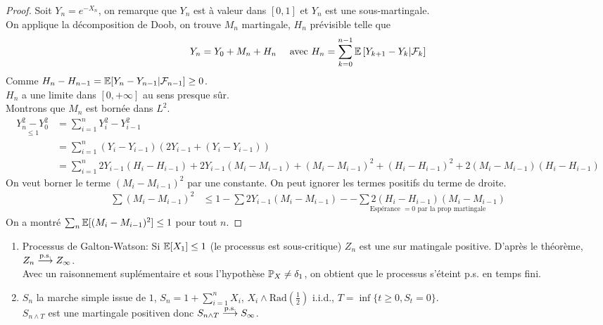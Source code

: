\documentclass[]{report}
\begin{document}
    \begin{proof}
        Soit $Y_n=e^{-X_n}$, on remarque que $Y_n$ est à valeur dans $[0,1]$ et $Y_n$ est une sous-martingale.\\
        On applique la décomposition de Doob, on trouve $M_n$ martingale, $H_n$ prévisible telle que
        \[Y_n=Y_0+M_n+H_n\quad \text{ avec }H_n=\sum_{k=0}^{n-1} \mathbb{E}\left[ Y_{k+1}- Y_k | \mathcal{F}_k\right]\]
        Comme $H_{n}-H_{n-1}=\mathbb{E}[Y_n-Y_{n-1}|\mathcal{F}_{n-1}]\ge 0$.\\
        $H_n$ a une limite dans $[0,+\infty]$ au sens presque sûr.\\
        Montrons que $M_n$ est bornée dans $L^2$.
        \begin{align*}
            \underset{\le 1}{Y_n^2-Y_0^2}&=\sum_{i=1}^{n}Y_i^2-Y_{i-1}^2\\
            &=\sum_{i=1}^{n}(Y_i-Y_{i-1})(2Y_{i-1}+(Y_i-Y_{i-1}))\\
            &=\sum_{i=1}^{n}2Y_{i-1}(H_i-H_{i-1})+2Y_{i-1}(M_i-M_{i-1}) +(M_i-M_{i-1})^2+(H_i-H_{i-1})^2+2(M_i-M_{i-1})(H_i-H_{i-1})
        \end{align*}
        On veut borner le terme $(M_i-M_{i-1})^2$ par une constante. On peut ignorer les termes positifs du terme de droite.
        \begin{align*}
            \sum(M_i-M_{i-1})^2&\le 1-\sum 2 Y_{i-1}(M_i-M_{i-1})-\underset{\text{Espérance $=0$ par la prop martingale}}{-\sum 2(H_i-H_{i-1})(M_i-M_{i-1})}
        \end{align*}
        On a montré $\sum_n \mathbb{E}[(M_i-M_{i-1})^2]\le 1$ pour tout $n$.
    \end{proof}

    \begin{ex}{}{}
        \begin{enumerate}
            \item Processus de Galton-Watson: Si $\mathbb{E}[X_1]\le 1$ (le processus est sous-critique) $Z_n$ est une sur matingale positive. D'après le théorème, $Z_n\overset{\text{p.s.}}{\longrightarrow} Z_\infty$.\\
            Avec un raisonnement suplémentaire et sous l'hypothèse $\mathbb{P}_X\neq \delta_1$, on obtient que le processus s'éteint p.s. en temps fini.
            \item $S_n$ la marche simple issue de $1$, $S_n=1+\sum_{i=1}^{n}X_i$, $X_i \wedge \text{Rad}(\frac{1}{2})$ i.i.d., $T=\inf\{t\ge 0,S_t=0\}$.\\
            $S_{n\wedge T}$ est une martingale positiven donc $S_{n\wedge T}\overset{\text{p.s.}}{\longrightarrow} S_\infty$.\\
        \end{enumerate}
    \end{ex}
\end{document}
